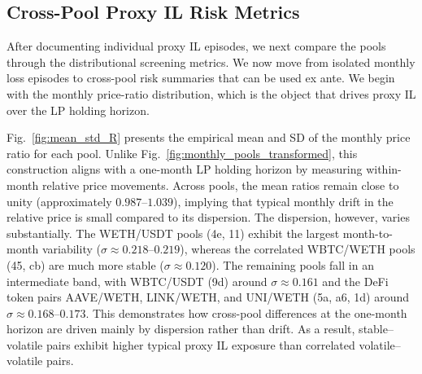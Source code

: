 \documentclass[anonymous]{lipics-v2021}
\begin{document}
{\subsection{Cross-Pool Proxy IL Risk Metrics}

After documenting individual proxy IL episodes, we next compare the pools through the distributional screening metrics. 
We now move from isolated monthly loss episodes to cross-pool risk summaries that can be used ex ante. 
We begin with the monthly price-ratio distribution, which is the object that drives proxy IL over the LP holding horizon.


Fig.~\ref{fig:mean_std_R} presents the empirical mean and SD of the monthly price ratio for each pool.
Unlike Fig.~\ref{fig:monthly_pools_transformed}, this construction aligns with a one-month LP holding horizon by measuring within-month relative price movements.
Across pools, the mean ratios remain close to unity (approximately \(0.987\)--\(1.039\)), implying that typical monthly drift in the relative price is small compared to its dispersion.
The dispersion, however, varies substantially. The WETH/USDT pools (4e, 11) exhibit the largest month-to-month variability
(\(\sigma \approx 0.218\)--\(0.219\)), whereas the correlated WBTC/WETH pools (45, cb) are much more stable
(\(\sigma \approx 0.120\)).
The remaining pools fall in an intermediate band, with WBTC/USDT (9d) around \(\sigma \approx 0.161\) and the DeFi token pairs AAVE/WETH, LINK/WETH, and UNI/WETH (5a, a6, 1d) around \(\sigma \approx 0.168\)--\(0.173\).
This demonstrates how cross-pool differences at the one-month horizon are driven mainly by dispersion rather than drift. 
As a result, stable--volatile pairs exhibit higher typical proxy IL exposure than correlated volatile--volatile pairs.

\begin{figure}[t]
\centering

\begin{minipage}[t]{0.35\textwidth}
\centering
\resizebox{\textwidth}{!}{%
    
}
\label{fig:mean_std_R}
\end{minipage}
\hfill
\begin{minipage}[t]{0.64\textwidth}
\centering
\resizebox{\textwidth}{!}{%
    
}
\label{fig:monthly_il_summary_metrics}
\end{minipage}

\end{figure}

}
\end{document}
